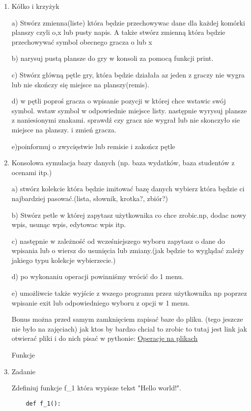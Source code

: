\documentclass[11pt]{article}
\begin{document}
\begin{enumerate}
\item 
\begin{Large}
	Kółko i krzyżyk
\end{Large}
\par
a) Stwórz zmienna(liste) która będzie przechowywac dane dla każdej komórki planszy czyli o,x lub pusty napis. A także stwórz zmienną która będzie przechowywać symbol obecnego gracza o lub x
\par
b) narysuj pustą plansze do gry w konsoli za pomocą funkcji print.
\par
c) Stwórz główną pętle gry, która będzie działała az jeden z graczy nie wygra lub nie skończy się miejsce na planszy(remis).
\par
d) w pętli poproś gracza o wpisanie pozycji w której chce wstawic swój symbol. wstaw symbol w odpowiednie miejsce listy. następnie wyrysuj plansze z naniesionymi znakami. sprawdź czy gracz nie wygrał lub nie skonczyło sie miejsce na planszy. i zmień gracza.
\par
e)poinformuj o zwycięstwie lub remisie i zakończ pętle

\item 
\begin{Large}
	Konsolowa symulacja bazy danych (np. baza wydatków, baza studentów z ocenami itp.)
\end{Large}
\par
a) stwórz kolekcie która będzie imitować bazę danych wybierz która będzie ci najbardziej pasować.(lista, słownik, krotka?, zbiór?)
\par
b) Stwórz petle w której zapytasz użytkownika co chce zrobic.np, dodac nowy wpis, usunąc wpis, edytowac wpis itp.
\par
c) następnie w zależność od wcześniejszego wyboru zapytasz o dane do wpisania lub o wiersz do usunięcia lub zmiany.(jak będzie to wyglądać zależy jakiego typu kolekcje wybierzecie.)
\par
d) po wykonaniu operacji powinniśmy wrócić do 1 menu.
\par
e) umożliwcie także wyjście z wszego programu przez użytkownika np poprzez wpisanie exit lub odpowiedniego wyboru z opcji w 1 menu.
\par
Bonus można przed samym zamknięciem zapisać baze do pliku. (tego jeszcze nie było na zajęciach) jak ktos by bardzo chcial to zrobic to tutaj jest link jak otwierać pliki i do nich pisać w pythonie: \href{http://davinci.mimuw.edu.pl/samouczek-python-python/operacje-na-plikach}{Operacje na plikach}

\medskip
\begin{Large}
	Funkcje
\end{Large}
\par
\item 
\begin{Large}
	Zadanie
\end{Large}
\par
Zdefiniuj funkcje f\_1 która wypisze tekst "Hello world!".
\begin{lstlisting}
	def f_1():
	

\end{lstlisting}
\end{enumerate}
\end{document}
